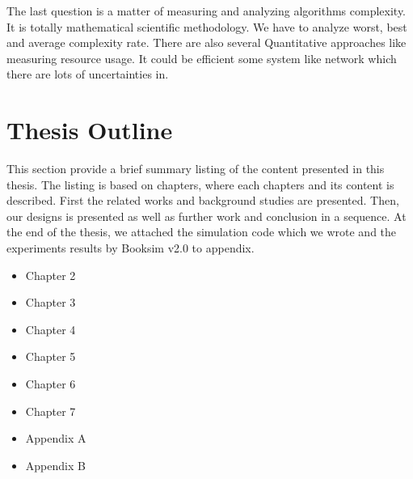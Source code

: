 	The last question is a matter of measuring and analyzing algorithms complexity. It is totally mathematical scientific methodology. We have to analyze worst, best and average complexity rate. There are also several Quantitative approaches like measuring resource usage. It could be efficient some system like network which there are lots of uncertainties in.


\section{Thesis Outline}
	This section provide a brief summary listing of the content presented in this thesis. The listing is based on chapters, where each chapters and its content is described. First the related works and background studies are presented. Then, our designs is presented as well as further work and conclusion in a sequence. At the end of the thesis, we attached the simulation code which we wrote and the experiments results by Booksim v2.0 to appendix.
\begin{itemize}
\item Chapter 2
\item Chapter 3
\item Chapter 4
\item Chapter 5
\item Chapter 6
\item Chapter 7
\item Appendix A
\item Appendix B
\end{itemize}
